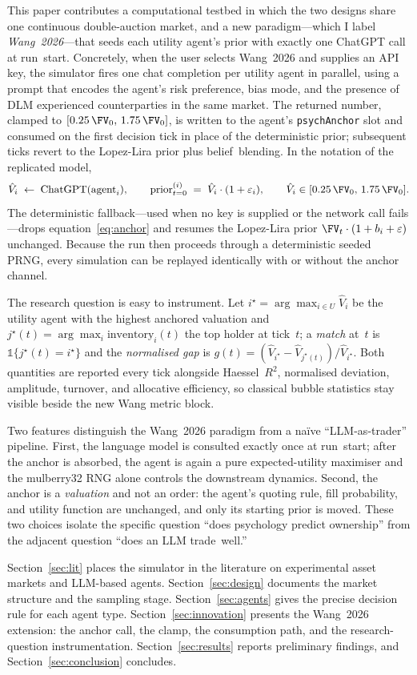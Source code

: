This paper contributes a computational testbed in which the two
designs share one continuous double-auction market, and a new
paradigm---which I label \emph{Wang~2026}---that seeds each utility
agent's prior with exactly one ChatGPT call at run~start. Concretely,
when the user selects Wang~2026 and supplies an API key, the
simulator fires one chat completion per utility agent in parallel,
using a prompt that encodes the agent's risk preference, bias mode,
and the presence of DLM experienced counterparties in the same
market. The returned number, clamped to
$[0.25\,\FV_0,\,1.75\,\FV_0]$, is written to the agent's
\texttt{psychAnchor} slot and consumed on the first decision tick in
place of the deterministic prior; subsequent ticks revert to the
Lopez-Lira prior plus belief~blending. In the notation of the
replicated model,
\begin{equation}
\hat{V}_i \;\leftarrow\; \mathrm{ChatGPT}(\text{agent}_i),
\qquad
\mathrm{prior}_{t=0}^{(i)} \;=\; \hat{V}_i\cdot(1+\varepsilon_i),
\qquad \hat{V}_i\in[0.25\,\FV_0,\,1.75\,\FV_0].
\label{eq:anchor}
\end{equation}
The deterministic fallback---used when no key is supplied or the
network call fails---drops equation~\eqref{eq:anchor} and resumes the
Lopez-Lira prior $\FV_t\cdot(1+b_i+\varepsilon)$ unchanged. Because
the run then proceeds through a deterministic seeded PRNG, every
simulation can be replayed identically with or without the anchor
channel.

The research question is easy to instrument. Let
$i^\star=\arg\max_{i\in U}\hat{V}_i$ be the utility agent with the
highest anchored valuation and
$j^\star(t)=\arg\max_i\text{inventory}_i(t)$ the top holder at
tick~$t$; a \emph{match} at~$t$ is
$\mathbb{1}\{j^\star(t)=i^\star\}$ and the \emph{normalised gap} is
$g(t)=(\hat V_{i^\star}-\hat V_{j^\star(t)})/\hat V_{i^\star}$.
Both quantities are reported every tick alongside Haessel~$R^2$,
normalised deviation, amplitude, turnover, and allocative
efficiency, so classical bubble statistics stay visible beside the
new Wang metric block.

Two features distinguish the Wang~2026 paradigm from a na\"ive
``LLM-as-trader'' pipeline. First, the language model is consulted
exactly once at run~start; after the anchor is absorbed, the agent is
again a pure expected-utility maximiser and the mulberry32 RNG alone
controls the downstream dynamics. Second, the anchor is a
\emph{valuation} and not an order: the agent's quoting rule, fill
probability, and utility function are unchanged, and only its starting
prior is moved. These two choices isolate the specific question
``does psychology predict ownership'' from the adjacent question
``does an LLM trade~well.''

Section~\ref{sec:lit} places the simulator in the literature on
experimental asset markets and LLM-based agents.
Section~\ref{sec:design} documents the market structure and the
sampling stage. Section~\ref{sec:agents} gives the precise decision
rule for each agent type. Section~\ref{sec:innovation} presents the
Wang~2026 extension: the anchor call, the clamp, the consumption
path, and the research-question instrumentation.
Section~\ref{sec:results} reports preliminary findings, and
Section~\ref{sec:conclusion} concludes.
